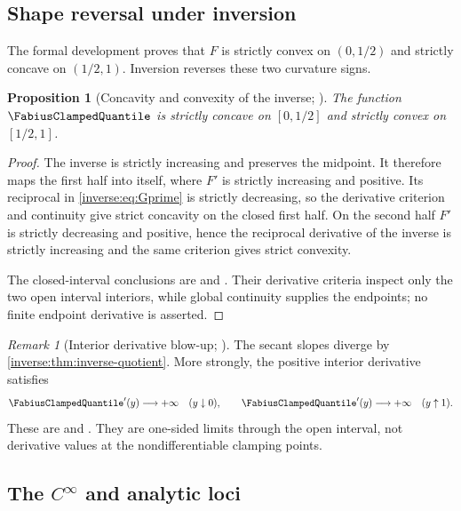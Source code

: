 \documentclass[11pt,oneside]{article}
\newtheorem{proposition}[proposition]{Proposition}
\theoremstyle{definition}
\theoremstyle{remark}
\newtheorem{remark}[remark]{Remark}
\begin{document}
\subsection{Shape reversal under inversion}

The formal development proves that $F$ is strictly convex on
$(0,1/2)$ and strictly concave on $(1/2,1)$.  Inversion reverses these
two curvature signs.

\begin{proposition}[Concavity and convexity of the inverse; \Formalized]
\label{inverse:prop:inverse-shape}
The function $\FabiusClampedQuantile$ is strictly concave on $[0,1/2]$ and strictly convex
on $[1/2,1]$.
\end{proposition}

\begin{proof}
The inverse is strictly increasing and preserves the midpoint.  It therefore
maps the first half into itself, where $F'$ is strictly increasing and
positive.  Its reciprocal in \eqref{inverse:eq:Gprime} is strictly decreasing, so the
derivative criterion and continuity give strict concavity on the closed first
half.  On the second half $F'$ is strictly decreasing and positive, hence the
reciprocal derivative of the inverse is strictly increasing and the same
criterion gives strict convexity.

The closed-interval conclusions are
 and
.  Their derivative criteria inspect
only the two open interval interiors, while global continuity supplies the
endpoints; no finite endpoint derivative is asserted.
\end{proof}

\begin{remark}[Interior derivative blow-up; \Formalized]
The secant slopes diverge by \cref{inverse:thm:inverse-quotient}.  More
strongly, the positive interior derivative satisfies
\[
 \FabiusClampedQuantile'(y)\longrightarrow+\infty\quad(y\downarrow0),\qquad
 \FabiusClampedQuantile'(y)\longrightarrow+\infty\quad(y\uparrow1).
\]
These are  and
.  They are one-sided limits
through the open interval, not derivative values at the nondifferentiable
clamping points.
\end{remark}

\subsection{\texorpdfstring{The \(C^\infty\) and analytic loci}{The smooth and analytic loci}}
\end{document}
